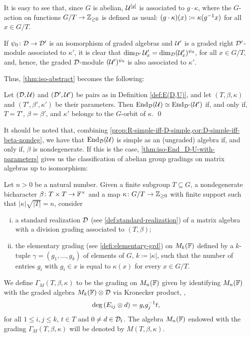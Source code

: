 It is easy to see that, since $G$ is abelian, $\mathcal U^{[g]}$ is associated to $g \cdot \kappa$, where the $G$-action on functions $G/T \to \mathbb{Z}_{\geq 0}$ is defined as usual: $(g\cdot \kappa) (x) \coloneqq \kappa(g^{-1} x)$ for all $x\in G/T$.

If $\psi_0\colon \mathcal{D} \to \mathcal{D}'$ is an isomorphism of graded algebras and $\mathcal U'$ is a graded right $\mathcal{D}'$-module associated to $\kappa'$, it is clear that $\dim_{\mathcal{D}'} \mathcal U_x' = \dim_{\mathcal{D}} (\mathcal U_x')^{\psi_0}$, for all $x \in G/T$, and, hence, the graded $\mathcal{D}$-module $(\mathcal U')^{\psi_0}$ is also associated to $\kappa'$. 

Thus, \cref{thm:iso-abstract} becomes the following:

\begin{thm}\label{thm:iso-End_D-U-with-parameters}
	Let $(\mathcal{D}, \mathcal U)$ and $(\mathcal{D}', \mathcal U')$ be pairs as in Definition \ref{def:E(D,U)}, and let $(T, \beta, \kappa)$ and $(T', \beta', \kappa')$ be their parameters. 
	Then $\operatorname{End}_{\mathcal{D}} (\mathcal U) \simeq \operatorname{End}_{\mathcal{D}'} (\mathcal U')$ if, and only if, $T = T'$, $\beta = \beta'$, and $\kappa'$ belongs to the $G$-orbit of $\kappa$. \qed
\end{thm}

It should be noted that, combining \cref{prop:R-simple-iff-D-simple,cor:D-simple-iff-beta-nondeg}, we have that $\operatorname{End}_{\mathcal{D}} (\mathcal U)$ is simple as an (ungraded) algebra if, and only if, $\beta$ is nondegenerate. 
If this is the case, \cref{thm:iso-End_D-U-with-parameters} gives us the classification of abelian group gradings on matrix algebras up to isomorphism:

\begin{defi}\label{def:Gamma-T-beta-kappa}
    Let $n > 0$ be a natural number. 
    Given a finite subgroup $T \subseteq G$, a nondegenerate bicharacter $\beta\colon T\times T \to \mathbb{F}^\times$ and a map $\kappa\colon G/T \to \mathbb{Z}_{\geq 0}$ with finite support such that $|\kappa| \sqrt{|T|} = n$, consider
    \begin{enumerate}[(i)]
        \item a standard realization $\mathcal{D}$ (see \cref{def:standard-realization}) of a matrix algebra with a division grading associated to $(T,\beta)$;
        \item the elementary grading (see \cref{defi:elementary-grd}) on $M_{k}(\mathbb{F})$ defined by a $k$-tuple $\gamma = (g_1, \ldots, g_{k})$ of elements of $G$, $k \coloneqq |\kappa|$, such that the number of entries $g_i$ with $g_i\in x$ is equal to $\kappa (x)$ for every $x\in G/T$. 
    \end{enumerate}
    We define $\Gamma_M (T, \beta, \kappa)$ to be the grading on $M_n(\mathbb{F})$ given by identifying $M_n(\mathbb{F})$ with the graded algebra $M_k(\mathbb{F}) \otimes \mathcal{D}$ via Kronecker product, \ie,
    \[
        \deg \left( E_{ij} \otimes d \right) = g_ig_j^{-1} t,
    \] 
    for all $1\leq i, j \leq k$, $t\in T$ and $0 \neq d \in \mathcal{D}_t$. 
    The algebra $M_n(\mathbb{F})$ endowed with the grading $\Gamma_M (T, \beta, \kappa)$ will be denoted by $M(T, \beta, \kappa)$.
\end{defi}

